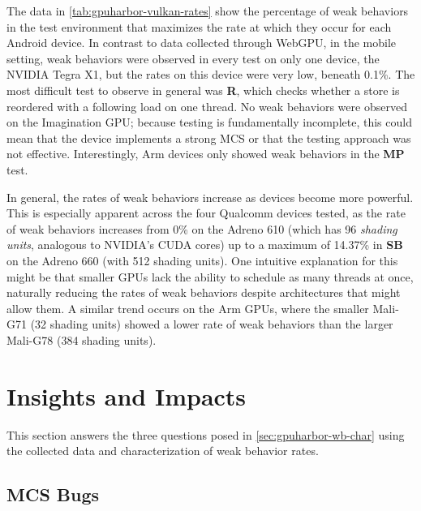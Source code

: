 The data in \mytab\ref{tab:gpuharbor-vulkan-rates} show the percentage of weak behaviors in the test environment that maximizes the rate at which they occur for each Android device. In contrast to data collected through WebGPU, in the mobile setting, weak behaviors were observed in every test on only one device, the NVIDIA Tegra X1, but the rates on this device were very low, beneath 0.1\%. The most difficult test to observe in general was \textbf{R}, which checks whether a store is reordered with a following load on one thread. No weak behaviors were observed on the Imagination GPU; because testing is fundamentally incomplete, this could mean that the device implements a strong MCS or that the testing approach was not effective. Interestingly, Arm devices only showed weak behaviors in the \textbf{MP} test.

In general, the rates of weak behaviors increase as devices become more powerful. This is especially apparent across the four Qualcomm devices tested, as the rate of weak behaviors increases from 0\% on the Adreno 610 (which has 96 \textit{shading units}, analogous to NVIDIA's CUDA cores) up to a maximum of 14.37\% in \textbf{SB} on the Adreno 660 (with 512 shading units). One intuitive explanation for this might be that smaller GPUs lack the ability to schedule as many threads at once, naturally reducing the rates of weak behaviors despite architectures that might allow them. A similar trend occurs on the Arm GPUs, where the smaller Mali-G71 (32 shading units) showed a lower rate of weak behaviors than the larger Mali-G78 (384 shading units).


\section{Insights and Impacts \label{sec:gpuharbor-insight-impact}}

This section answers the three questions posed in \mysec\ref{sec:gpuharbor-wb-char} using the collected data and characterization of weak behavior rates.

\subsection{MCS Bugs \label{sec:gpuharbor-vulkan-bugs}}

